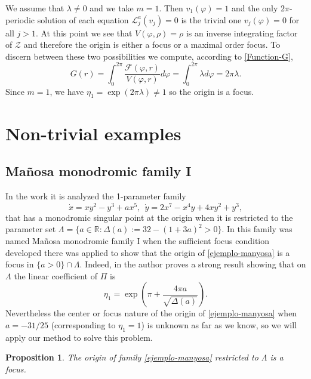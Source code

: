 \documentclass[12pt]{amsart}
\newtheorem {proposition} [theorem]{Proposition}
\begin{document}
We assume that $\lambda \neq 0$ and we take $m=1$. Then $v_1(\varphi)=1$ and the only $2 \pi$-periodic solution of each equation $\mathcal{L}^{a}_j(v_j) = 0$ is the trivial one $v_j(\varphi)= 0$ for all $j >1$. At this point we see that $V(\varphi, \rho) = \rho$ is an inverse integrating factor of $\mathcal{Z}$ and therefore the origin is either a focus or a maximal order focus. To discern between these two possibilities we compute, according to \eqref{Function-G},
$$
G(r) = \int_0^{2 \pi} \frac{\mathcal{F}(\varphi, r)}{V(\varphi, r)} d \varphi = \int_0^{2 \pi} \lambda d \varphi = 2\pi \lambda.
$$
Since $m=1$, we have $\eta_1 = \exp(2 \pi \lambda) \neq 1$ so the origin is a focus.

\section{Non-trivial examples}

\subsection{Ma\~{n}osa monodromic family I}

In the work \cite{Ma} it is analyzed the 1-parameter family
\begin{equation}\label{ejemplo-manyosa}
\dot{x} = x y^2 - y^3 + a x^5, \ \ \dot{y} = 2 x^7 - x^4 y + 4 x y^2 + y^3,
\end{equation}
that has a monodromic singular point at the origin when it is restricted to the parameter set $\Lambda = \{a \in \mathbb{R} : \Delta(a) := 32 - (1+3 a)^2 >0 \}$. In \cite{GaGi3} this family was named Ma\~{n}osa monodromic family I when the sufficient focus condition developed there was applied to show that the origin of \eqref{ejemplo-manyosa} is a focus in $\{ a >0 \} \cap \Lambda$. Indeed, in \cite{Ma} the author proves a strong result showing that on $\Lambda$ the linear coefficient of $\Pi$ is
\begin{equation}\label{eta1-manyosa}
\eta_1 = \exp\left( \pi + \frac{4 \pi a}{\sqrt{\Delta(a)}} \right).
\end{equation}
Nevertheless the center or focus nature of the origin of \eqref{ejemplo-manyosa} when $a = -31/25$ (corresponding to $\eta_1 = 1$) is unknown as far as we know, so we will apply our method to solve this problem.

\begin{proposition}\label{prop-manyosa-I-foco}
The origin of family \eqref{ejemplo-manyosa} restricted to $\Lambda$ is a focus.
\end{proposition}
\end{document}
